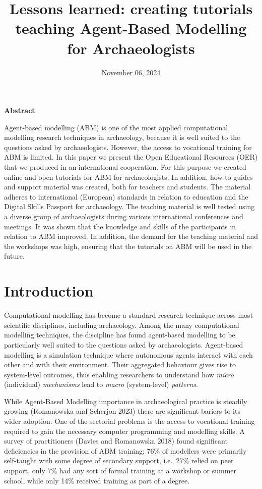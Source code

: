 \documentclass[
]{article}
\title{Lessons learned: creating tutorials teaching Agent-Based Modelling for Archaeologists}
\author{}
\date{\vspace{-2.5em}November 06, 2024}
\begin{document}
\maketitle

{
\setcounter{tocdepth}{2}
\tableofcontents
}
\textbf{Abstract}

Agent-based modelling (ABM) is one of the most applied computational modelling research techniques in archaeology, because it is well suited to the questions asked by archaeologists. However, the access to vocational training for ABM is limited. In this paper we present the Open Educational Resources (OER) that we produced in an international cooperation. For this purpose we created online and open tutorials for ABM for archaeologists. In addition, how-to guides and support material was created, both for teachers and students. The material adheres to international (European) standards in relation to education and the Digital Skills Passport for archaeology. The teaching material is well tested using a diverse group of archaeologists during various international conferences and meetings. It was shown that the knowledge and skills of the participants in relation to ABM improved. In addition, the demand for the teaching material and the workshops was high, ensuring that the tutorials on ABM will be used in the future.

\hypertarget{introduction}{%
\section{Introduction}\label{introduction}}

Computational modelling has become a standard research technique across most scientific disciplines, including archaeology. Among the many computational modelling techniques, the discipline has found agent-based modelling to be particularly well suited to the questions asked by archaeologists. Agent-based modelling is a simulation technique where autonomous agents interact with each other and with their environment. Their aggregated behaviour gives rise to system-level outcomes, thus enabling researchers to understand how \emph{micro} (individual) \emph{mechanisms} lead to \emph{macro} (system-level) \emph{patterns}.

While Agent-Based Modelling importance in archaeological practice is steadily growing (Romanowska and Scherjon 2023) there are significant bariers to its wider adoption. One of the sectorial problems is the access to vocational training required to gain the necessary computer programming and modelling skills. A survey of practitioners (Davies and Romanowska 2018) found significant deficiencies in the provision of ABM training; 76\% of modellers were primarily self-taught with some degree of secondary support, i.e.~27\% relied on peer support, only 7\% had any sort of formal training at a workshop or summer school, while only 14\% received training as part of a degree.
\end{document}
